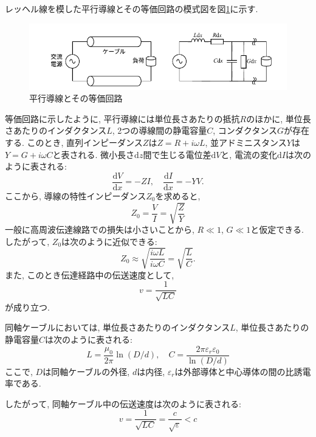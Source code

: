 \documentclass[uplatex,dvipdfmx,a4j,12pt]{jsarticle}
\newcommand{\diff}{\mathrm{d}} %
\begin{document}
レッヘル線を模した平行導線とその等価回路の模式図を図\ref{fig:lecher_line}に示す.
\begin{figure}[h]
    \centering
    \includegraphics[width=0.9\linewidth]{img/lecher_line.pdf}
    \caption{平行導線とその等価回路}
    \label{fig:lecher_line}
\end{figure}

等価回路に示したように, 平行導線には単位長さあたりの抵抗$R$のほかに, 単位長さあたりのインダクタンス$L$, 
2つの導線間の静電容量$C$, コンダクタンス$G$が存在する.
このとき, 直列インピーダンス$Z$は$Z = R + i\omega L$, 並アドミニスタンス$Y$は$Y = G + i\omega C$と表される.
微小長さ$\diff z$間で生じる電位差$\diff V$と, 電流の変化$\diff I$は次のように表される:
\begin{equation}
  \frac{\diff V}{\diff x} = - Z I, \quad \frac{\diff I}{\diff x} = - Y V.
\end{equation}
ここから, 導線の特性インピーダンス$Z_0$を求めると,
\begin{equation}
  Z_0 = \frac{V}{I} = \sqrt{\frac{Z}{Y}} 
\end{equation}
一般に高周波伝達線路での損失は小さいことから, $R \ll 1$, $G \ll 1$と仮定できる.
したがって, $Z_0$は次のように近似できる:
\begin{equation}
  Z_0 \approx \sqrt{\frac{i\omega L}{i\omega C}} = \sqrt{\frac{L}{C}}.
\end{equation}
また, このとき伝達経路中の伝送速度として,
\begin{equation}
  v = \frac{1}{\sqrt{LC}}
\end{equation}
が成り立つ.

\enskip

同軸ケーブルにおいては, 単位長さあたりのインダクタンス$L$, 単位長さあたりの静電容量$C$は次のように表される:
\begin{equation}
  L = \frac{\mu_0}{2\pi} \ln\left(D/d\right), \quad C = \frac{2\pi\varepsilon_r \varepsilon_0}{\ln\left(D/d\right) }
\end{equation}
ここで, $D$は同軸ケーブルの外径, $d$は内径, $\varepsilon_r$は外部導体と中心導体の間の比誘電率である.

したがって, 同軸ケーブル中の伝送速度は次のように表される:
\begin{equation}
  v = \frac{1}{\sqrt{LC}} = \frac{c}{\sqrt{\varepsilon}} < c \label{eq:velocity_cable}
\end{equation}
\end{document}
